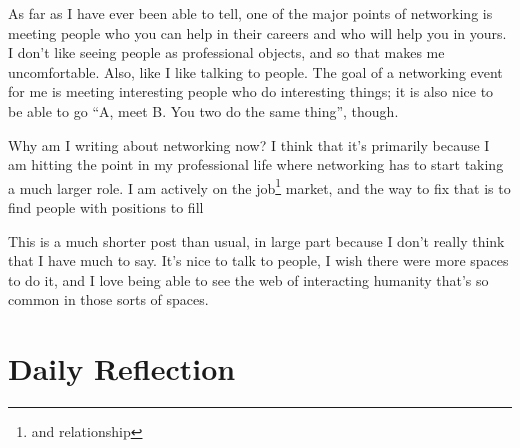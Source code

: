 \documentclass[12pt]{article}
\newcommand{\say}[1]{``#1''}
\renewcommand{\,}{\textsuperscript{,}}
\begin{document}
As far as I have ever been able to tell, one of the major points of networking is meeting people who you can help in their careers and who will help you in yours.  
I don't like seeing people as professional objects, and so that makes me uncomfortable.  
Also, like I like talking to people.  
The goal of a networking event for me is meeting interesting people who do interesting things; it is also nice to be able to go \say{A, meet B. You two do the same thing}, though.

Why am I writing about networking now?  
I think that it's primarily because I am hitting the point in my professional life where networking has to start taking a much larger role.  
I am actively on the job\footnote{and relationship} market, and the way to fix that is to find people with positions to fill

This is a much shorter post than usual, in large part because I don't really think that I have much to say.  
It's nice to talk to people, I wish there were more spaces to do it, and I love being able to see the web of interacting humanity that's so common in those sorts of spaces.

\section{Daily Reflection}
\end{document}
